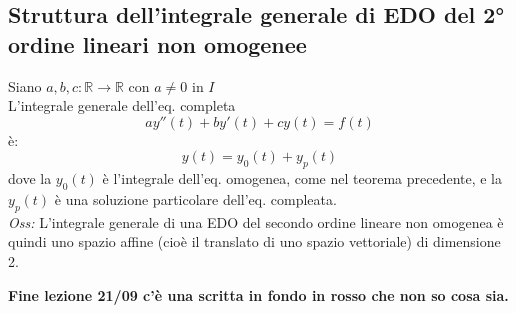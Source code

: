 \documentclass{scrreprt}
\begin{document}
\subsection{Struttura dell'integrale generale di EDO del 2° ordine lineari non omogenee}
Siano $a,b,c:\mathbb{R} \to \mathbb{R}$ con $a\neq 0$ in $I$\\
L'integrale generale dell'eq. completa
\begin{equation}
	ay''(t) + by'(t) + cy(t) = f(t)
\end{equation}
è:
\begin{equation}
	y(t) = y_0(t) + y_p(t)
\end{equation}
dove la $y_0(t)$ è l'integrale dell'eq. omogenea, come nel teorema precedente, e la $y_p(t)$ è una soluzione particolare dell'eq. compleata.\\

\emph{Oss:} L'integrale generale di una EDO del secondo ordine lineare non omogenea è quindi uno spazio affine (cioè il translato di uno spazio vettoriale) di dimensione 2.\\

\begin{center}
	\textbf{Fine lezione 21/09 c'è una scritta in fondo in rosso che non so cosa sia.}
\end{center}



\newpage
\end{document}
